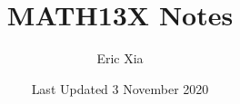 \documentclass{article}
\title{MATH13X Notes}
\author{Eric Xia}
\date{Last Updated 3 November 2020}
\begin{document}
    \maketitle
    \tableofcontents
    \pagebreak



    
    
    
    
    
    
\end{document}
